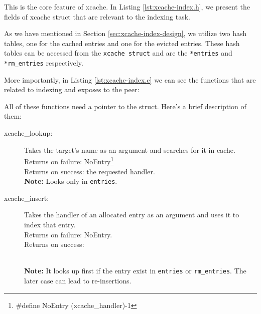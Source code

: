 This is the core feature of xcache. In Listing \ref{lst:xcache-index.h}, we 
present the fields of xcache struct that are relevant to the indexing task.


As we have mentioned in Section \ref{sec:xcache-index-design}, we utilize two 
hash tables, one for the cached entries and one for the evicted entries. These 
hash tables can be accessed from the \texttt{xcache struct} and are the 
\texttt{*entries} and \texttt{*rm\_entries} respectively.

More importantly, in Listing \ref{lst:xcache-index.c} we can see the functions 
that are related to indexing and \xcache exposes to the peer:


All of these functions need a pointer to the \xcache struct. Here's a brief 
description of them:

\begin{description}
	\item[xcache\_lookup:]
		Takes the target's name as an argument and searches for it in 
		cache.\\
		Returns on failure: NoEntry\footnote{\#define NoEntry 
			(xcache\_handler)-1}\\
		Returns on success: the requested handler.\\
		\textbf{Note:} Looks only in \texttt{entries}.
	\item[xcache\_insert:]
		Takes the handler of an allocated entry as an argument and uses 
		it to index that entry.\\
		Returns on failure: NoEntry.\\
		Returns on success:
		\\
		\textbf{Note:} It looks up first if the entry exist in 
		\texttt{entries} or \texttt{rm\_entries}. The later case can 
		lead to re-insertions.
		\begin{comment}
			Probably not needed
		\item[xcache\_remove:]
			Takes the handler of an allocated entry as an argument and uses 
			it to remove that entry.\\
			Returns on failure: -1.
			Returns on success: 0.
			\textbf{Note:} Removes entries only from \texttt{entries} hash 
			table.
		\end{comment}
\end{description}

